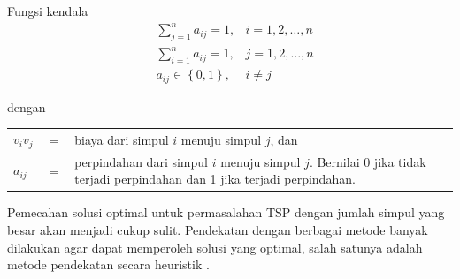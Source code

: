 {    \noindent
    Fungsi kendala
    \begin{equation*}
        \begin{aligned}
             & \sum^{n}_{j=1} a_{ij} = 1,     & i = 1,2,\dots,n \\
             & \sum^{n}_{i=1} a_{ij} = 1,     & j = 1,2,\dots,n \\
             & a_{ij} \in \left\{0,1\right\}, & i \neq j
        \end{aligned}
    \end{equation*}

    \noindent
    dengan
    \begin{table}
        \begin{tabular}{lcp{11cm}}
            $v_{i}v_{j}$ & $ = $ & biaya dari simpul $i$ menuju simpul $j$, dan                                                                             \\
            $a_{ij}$     & $=$   & perpindahan dari simpul $i$ menuju simpul $j$. Bernilai 0 jika tidak terjadi perpindahan dan 1 jika terjadi perpindahan.
        \end{tabular}
    \end{table}
    \vspace{-5mm}

    Pemecahan solusi optimal untuk permasalahan TSP dengan jumlah simpul yang besar akan menjadi cukup sulit.
    Pendekatan dengan berbagai metode banyak dilakukan agar dapat memperoleh solusi yang optimal,
    salah satunya adalah metode pendekatan secara heuristik .
}
\vspace{-3mm}

